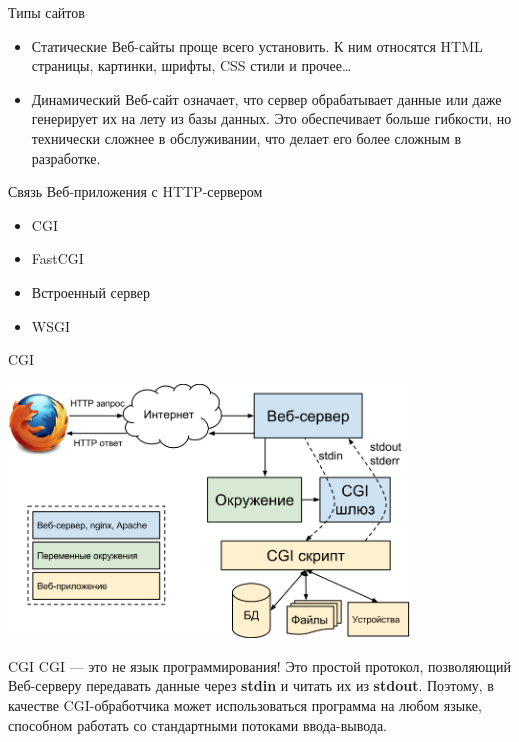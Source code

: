 \begin{frame}{Типы сайтов}
    \begin{itemize}
        \item Статические Веб-сайты проще всего установить. К ним относятся
            HTML страницы, картинки, шрифты, CSS стили и прочее\ldots
        \item Динамический Веб-сайт означает, что сервер обрабатывает данные или даже
            генерирует их на лету из базы данных. Это обеспечивает больше
            гибкости, но технически сложнее в обслуживании, что делает его
            более сложным в разработке.

    \end{itemize}
\end{frame}

\begin{frame}{Связь Веб-приложения с HTTP-сервером}
    \begin{itemize}
        \item CGI
        \item FastCGI
        \item Встроенный сервер
        \item WSGI
    \end{itemize}
\end{frame}

\begin{frame}{CGI}
    \begin{center}
        \includegraphics[width=4.2in]{media/cgi.png}
    \end{center}
\end{frame}

\begin{frame}{CGI}
    CGI — это не язык программирования!\newline
    Это простой протокол, позволяющий Веб-серверу передавать данные через
    \textbf{stdin} и читать их из \textbf{stdout}. \newline\newline
    Поэтому, в качестве CGI-обработчика может использоваться
    программа на любом языке, способном работать со стандартными потоками
    ввода-вывода.
\end{frame}

